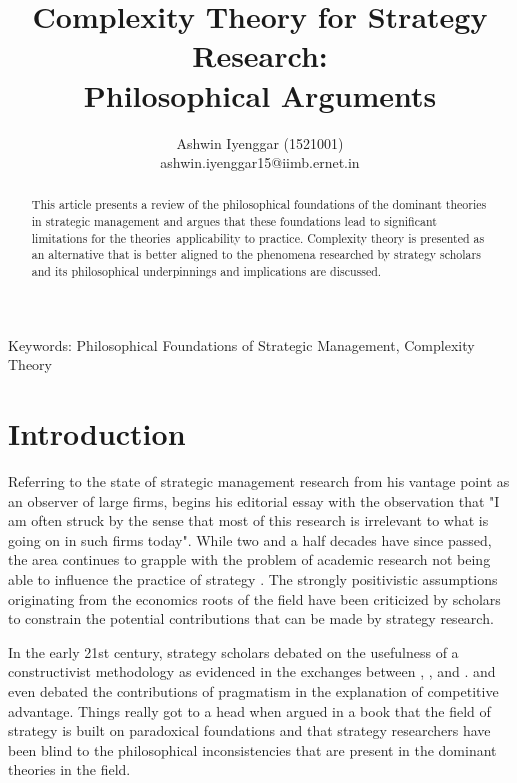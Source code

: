 \documentclass[12pt]{article}
\begin{document}
\title{Complexity Theory for Strategy Research:\\  Philosophical Arguments}
\author{Ashwin Iyenggar  (1521001) \\ ashwin.iyenggar15@iimb.ernet.in} 


\maketitle

\begin{abstract}
This article presents a review of the philosophical foundations of the dominant theories in strategic management and argues that these foundations lead to significant limitations for the theories\textquotesingle  \ applicability to practice.  Complexity theory is presented as an alternative that is better aligned to the phenomena researched by strategy scholars and its philosophical underpinnings and implications are discussed.
\end{abstract}


{Keywords:} Philosophical Foundations of Strategic Management, Complexity Theory

\section{Introduction}\label{S:Introduction}
Referring to the state of strategic management research from his vantage point as an observer of large firms, \cite{Bettis1991} begins his editorial essay with the observation that "I am often struck by the sense that most of this research is irrelevant to what is going on in such firms today". While two and a half decades have since passed, the area continues to grapple with the problem of academic research not being able to influence the practice of strategy \citep{Economist2007PracticallyIrrelevant}. The strongly positivistic assumptions originating from the economics roots of the field have been criticized by scholars to constrain the potential contributions that can be made by strategy research. 

In the early 21st century, strategy scholars debated on the usefulness of a constructivist methodology as evidenced in the exchanges between \cite{Mir2000}, \cite{Kwan2001}, and \cite{Mir2001}. \cite{Durand2002} and \cite{Powell2002} even debated the contributions of pragmatism in the explanation of competitive advantage. Things really got to a head when \cite{Rasche2008}   argued in a book  that the field of strategy is built on paradoxical foundations and that strategy researchers have been blind to the philosophical inconsistencies that are present in the dominant theories in the field. 
\end{document}
